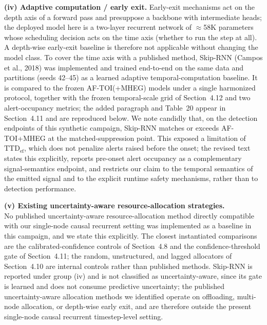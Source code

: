 \documentclass[1p,12pt,authoryear]{elsarticle}
\begin{document}
\vspace{2mm}
\noindent \textbf{(iv) Adaptive computation / early exit.} Early-exit mechanisms act on the depth axis of a forward pass and presuppose a backbone with intermediate heads; the deployed model here is a two-layer recurrent network of $\approx$58K parameters whose scheduling decision acts on the time axis (whether to run the step at all). A depth-wise early-exit baseline is therefore not applicable without changing the model class. To cover the time axis with a published method, Skip-RNN (Campos et al., 2018) was implemented and trained end-to-end on the same data and partitions (seeds 42--45) as a learned adaptive temporal-computation baseline. It is compared to the frozen AF-TOI(+MHEG) models under a single harmonized protocol, together with the frozen temporal-scale grid of Section~4.12 and two alert-occupancy metrics; the added paragraph and Table~20 appear in Section~4.11 and are reproduced below. We note candidly that, on the detection endpoints of this synthetic campaign, Skip-RNN matches or exceeds AF-TOI+MHEG at the matched-suppression point. This exposed a limitation of $\mathrm{TTD}_{\mathrm{ef}}$, which does not penalize alerts raised before the onset; the revised text states this explicitly, reports pre-onset alert occupancy as a complementary signal-semantics endpoint, and restricts our claim to the temporal semantics of the emitted signal and to the explicit runtime safety mechanisms, rather than to detection performance.

\vspace{2mm}
\noindent \textbf{(v) Existing uncertainty-aware resource-allocation strategies.}\\ No published uncertainty-aware resource-allocation method directly compatible with our single-node causal recurrent setting was implemented as a baseline in this campaign, and we state this explicitly. The closest instantiated comparisons are the calibrated-confidence controls of Section~4.8 and the confidence-threshold gate of Section~4.11; the random, unstructured, and lagged allocators of Section~4.10 are internal controls rather than published methods. Skip-RNN is reported under group (iv) and is not classified as uncertainty-aware, since its gate is learned and does not consume predictive uncertainty; the published uncertainty-aware allocation methods we identified operate on offloading, multi-node allocation, or depth-wise early exit, and are therefore outside the present single-node causal recurrent timestep-level setting.
\end{document}

